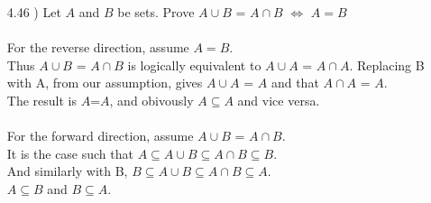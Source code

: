 \documentclass[12pt]{article}
\begin{document}
\begin{enumerate}
 		\item[4.46]) 
 			Let $A$ and $B$ be sets. Prove $A\cup B$ = $A\cap B$ $\iff$ $A=B$\\
 			\\For the reverse direction, assume $A=B$. \\Thus $A\cup B$ = $A\cap B$
 			is logically equivalent to $A\cup A$ = $A\cap A$.
 			Replacing B with A, from our assumption, gives $A\cup A$ = $A$ and that $A\cap A$ = $A$.\\
 			The result is $A$=$A$, and obivously $A \subseteq A$ and vice versa.\\
 			\\For the forward direction, assume $A\cup B$ = $A\cap B$.\\
 			It is the case such that $A\subseteq A\cup B \subseteq A\cap B\subseteq B$.\\
 			And similarly with B, $B\subseteq A\cup B \subseteq A\cap B\subseteq A$.
 			\\$A\subseteq B$ and $B\subseteq A$.
 			\fboxsep=2mm \fboxrule=1mm 
	\end{enumerate}
\end{document}
